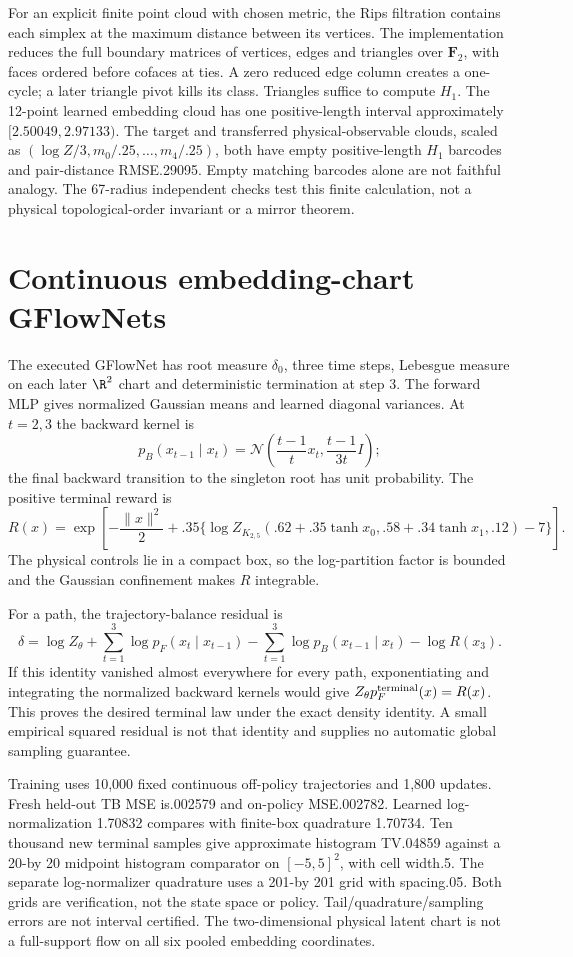 \documentclass[11pt,oneside,openany]{book}
\theoremstyle{definition}\newtheorem{definition}[theorem]{Definition}
\theoremstyle{remark}\newtheorem{remark}[theorem]{Remark}
\begin{document}
For an explicit finite point cloud with chosen metric, the Rips filtration
contains each simplex at the maximum distance between its vertices. The
implementation reduces the full boundary matrices of vertices, edges and
triangles over $\mathbf F_2$, with faces ordered before cofaces at ties.
A zero reduced edge column creates a one-cycle; a later triangle pivot
kills its class. Triangles suffice to compute $ H_1$. The 12-point learned
embedding cloud has one positive-length interval approximately
$[2.50049,2.97133)$. The target and transferred physical-observable clouds,
scaled as $(\log Z/3,m_0/.25,\ldots,m_4/.25)$, both have empty positive-length
$ H_1$ barcodes and pair-distance RMSE.29095. Empty matching barcodes alone
are not faithful analogy. The 67-radius independent checks test this finite
calculation, not a physical topological-order invariant or a mirror theorem.

\section{Continuous embedding-chart GFlowNets}
The executed GFlowNet \cite{QContinuousGFN} has root measure $\delta_0$,
three time steps, Lebesgue measure on each later $\R^2$ chart and deterministic
termination at step 3. The forward MLP gives normalized Gaussian means and
learned diagonal variances. At $ t=2,3$ the backward kernel is
\[
 p_B(x_{t-1}\mid x_t)
 =\mathcal N\!\left(\frac{t-1}{t}x_t,\frac{t-1}{3 t}I\right);
\]
the final backward transition to the singleton root has unit probability.
The positive terminal reward is
\[
 R(x)=\exp\!\left[-\frac{\|x\|^2}{2}
 +.35\{\log Z_{K_{2,5}}(.62+.35\tanh x_0,
                 .58+.34\tanh x_1,.12)-7\}\right].
\]
The physical controls lie in a compact box, so the log-partition factor is
bounded and the Gaussian confinement makes $ R $ integrable.

For a path, the trajectory-balance residual is
\[
 \delta=\log Z_\theta+\sum_{t=1}^3\log p_F(x_t\mid x_{t-1})
             -\sum_{t=1}^3\log p_B(x_{t-1}\mid x_t)-\log R(x_3).
\]
If this identity vanished almost everywhere for every path, exponentiating
and integrating the normalized backward kernels would give
$ Z_\theta p_F^{\rm terminal}(x)=R(x)$. This proves the desired terminal
law under the exact density identity. A small empirical squared residual
is not that identity and supplies no automatic global sampling guarantee.

Training uses 10,000 fixed continuous off-policy trajectories and 1,800
updates. Fresh held-out TB MSE is.002579 and on-policy MSE.002782.
Learned log-normalization 1.70832 compares with finite-box quadrature 1.70734.
Ten thousand new terminal samples give approximate histogram TV.04859
against a 20-by 20 midpoint histogram comparator on $[-5,5]^2$, with cell
width.5. The separate log-normalizer quadrature uses a 201-by 201 grid
with spacing.05. Both grids are verification, not the state space or policy. Tail/quadrature/sampling errors
are not interval certified. The two-dimensional physical latent chart is
not a full-support flow on all six pooled embedding coordinates.
\end{document}
